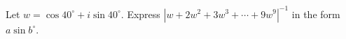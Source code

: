 Let $w=\cos40^\circ+i\sin40^\circ$. Express $\left|w+2w^2+3w^3+\cdots+9w^9\right|^{-1}$ in the form $a\sin b^\circ$.
